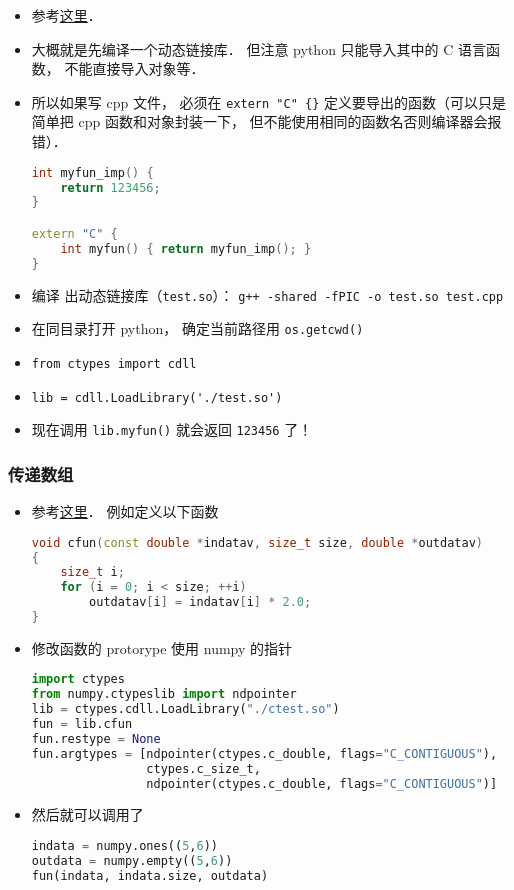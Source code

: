 
\begin{issues}
\issueDraft
\end{issues}

\begin{itemize}
\item 参考\href{https://www.geeksforgeeks.org/how-to-call-c-c-from-python/}{这里}．
\item 大概就是先编译一个动态链接库． 但注意 python 只能导入其中的 C 语言函数， 不能直接导入对象等．
\item 所以如果写 cpp 文件， 必须在 \verb|extern "C" {}| 定义要导出的函数（可以只是简单把 cpp 函数和对象封装一下， 但不能使用相同的函数名否则编译器会报错）．
\begin{lstlisting}[language=cpp, caption=test.cpp]
int myfun_imp() {
	return 123456;
}

extern "C" {
	int myfun() { return myfun_imp(); }
}
\end{lstlisting}
\item 编译 出动态链接库（\verb|test.so|）： \verb|g++ -shared -fPIC -o test.so test.cpp|
\item 在同目录打开 python， 确定当前路径用 \verb|os.getcwd()|
\item \verb|from ctypes import cdll|
\item \verb|lib = cdll.LoadLibrary('./test.so')|
\item 现在调用 \verb|lib.myfun()| 就会返回 \verb|123456| 了！
\end{itemize}

\subsubsection{传递数组}
\begin{itemize}
\item 参考\href{https://stackoverflow.com/questions/5862915/passing-numpy-arrays-to-a-c-function-for-input-and-output}{这里}． 例如定义以下函数
\begin{lstlisting}[language=cpp]
void cfun(const double *indatav, size_t size, double *outdatav) 
{
    size_t i;
    for (i = 0; i < size; ++i)
        outdatav[i] = indatav[i] * 2.0;
}
\end{lstlisting}
\item 修改函数的 protorype 使用 numpy 的指针
\begin{lstlisting}[language=python]
import ctypes
from numpy.ctypeslib import ndpointer
lib = ctypes.cdll.LoadLibrary("./ctest.so")
fun = lib.cfun
fun.restype = None
fun.argtypes = [ndpointer(ctypes.c_double, flags="C_CONTIGUOUS"),
                ctypes.c_size_t,
                ndpointer(ctypes.c_double, flags="C_CONTIGUOUS")]
\end{lstlisting}
\item 然后就可以调用了
\begin{lstlisting}[language=python]
indata = numpy.ones((5,6))
outdata = numpy.empty((5,6))
fun(indata, indata.size, outdata)
\end{lstlisting}
\end{itemize}

